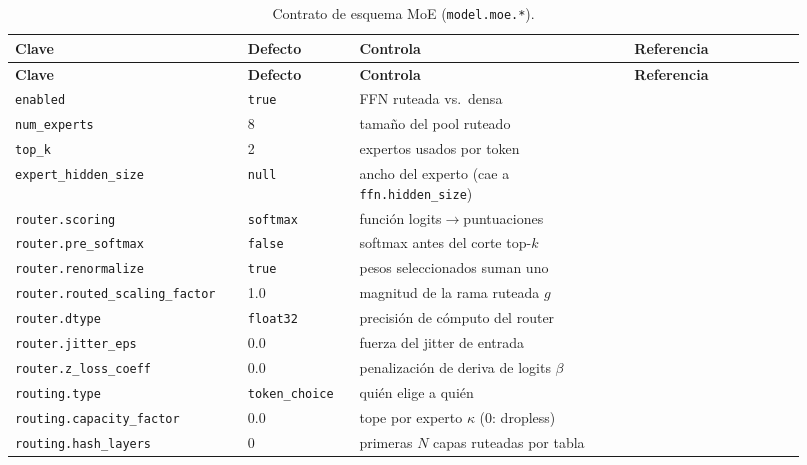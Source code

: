 {\small
\begin{longtable}{@{}L{0.27\linewidth}L{0.13\linewidth}L{0.32\linewidth}L{0.20\linewidth}@{}}
\caption{Contrato de esquema MoE (\texttt{model.moe.*}).}\label{tab:moe-schema-es}\\
\toprule
\textbf{Clave} & \textbf{Defecto} & \textbf{Controla} & \textbf{Referencia} \\
\midrule
\endfirsthead
\toprule
\textbf{Clave} & \textbf{Defecto} & \textbf{Controla} & \textbf{Referencia} \\
\midrule
\endhead
\texttt{enabled} & \texttt{true} & FFN ruteada vs.\ densa & \citet{shazeer2017moe} \\
\texttt{num\_experts} & 8 & tamaño del pool ruteado & \citet{fedus2021switch} \\
\texttt{top\_k} & 2 & expertos usados por token & \citet{fedus2021switch} \\
\texttt{expert\_hidden\_size} & \texttt{null} & ancho del experto (cae a \texttt{ffn.hidden\_size}) & \citet{deepseek2024v3} \\
\texttt{router.scoring} & \texttt{softmax} & función logits$\to$puntuaciones & \citet{deepseek2024v3,deepseek2026v4} \\
\texttt{router.pre\_softmax} & \texttt{false} & softmax antes del corte top-$k$ & \citet{fedus2021switch} \\
\texttt{router.renormalize} & \texttt{true} & pesos seleccionados suman uno & \citet{krajewski2025scaling} \\
\texttt{router.routed\_scaling\_factor} & 1.0 & magnitud de la rama ruteada $g$ & \citet{deepseek2024v3,kimiteam2026k3} \\
\texttt{router.dtype} & \texttt{float32} & precisión de cómputo del router & \citet{fedus2021switch,zoph2022stmoe} \\
\texttt{router.jitter\_eps} & 0.0 & fuerza del jitter de entrada & \citet{fedus2021switch} \\
\texttt{router.z\_loss\_coeff} & 0.0 & penalización de deriva de logits $\beta$ & \citet{zoph2022stmoe} \\
\texttt{routing.type} & \texttt{token\_choice} & quién elige a quién & \citet{zhou2022expertchoice} \\
\texttt{routing.capacity\_factor} & 0.0 & tope por experto $\kappa$ (0: dropless) & \citet{pangu2025ultra} \\
\texttt{routing.hash\_layers} & 0 & primeras $N$ capas ruteadas por tabla & \citet{roller2021hash,deepseek2026v4} \\

\end{longtable}}

